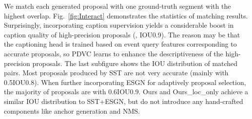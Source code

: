 We match each generated proposal with one ground-truth segment with the highest overlap. Fig.~\ref{fig:Interact} demonstrates the statistics of matching results. Surprisingly, incorporating caption supervision yields a considerable boost in caption quality of high-precision proposals (\ie, IOU0.9). The reason may be that the captioning head is trained based on event query features corresponding to accurate proposals, so PDVC learns to enhance the descriptiveness of the high-precision proposals. The last subfigure shows the IOU distribution of matched pairs. Most proposals produced by SST are not very accurate (mainly with 0.5{\rm IOU}0.8). When further incorporating ESGN for adaptively proposal selection, the majority of proposals are with 0.6{\rm IOU}0.9. Ours and Ours\_loc\_only achieve a similar IOU distribution to SST+ESGN, but do not introduce any hand-crafted components like anchor generation and NMS.

\begin{table}[]
\caption{Inference speed. We report average inference time (secs/video) of 100 sampled videos with a single Tesla V100 GPU.}
\vspace{-0.5 em}
\label{table:eff}
\end{table}

\begin{table}[]
\fontsize{8.5pt}{1em} \selectfont
    \centering
        \caption{Proposal quality with different loss types. Rec./Pre./F1 measures the localization performance, while B4/M/C measures dense captioning performance. \#p is the number of proposals.}
        \label{table:LossType}
        \vspace{-0.5em}
\end{table}

